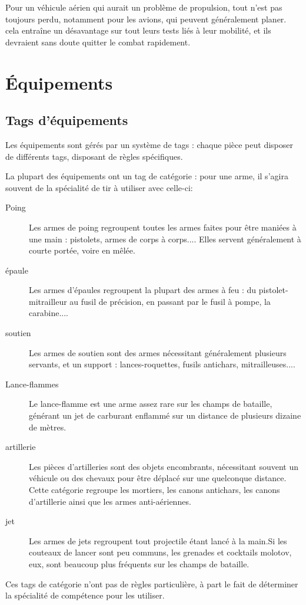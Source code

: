 \documentclass{report}
\begin{document}
\begin{multicols}{2}
Pour un véhicule aérien qui aurait un problème de propulsion, tout n'est pas toujours perdu, notamment pour les avions, qui peuvent généralement planer. cela entraîne un désavantage sur tout leurs tests liés à leur mobilité, et ils devraient sans doute quitter le combat rapidement.
\section{Équipements}
\subsection{Tags d'équipements}
Les équipements sont gérés par un système de tags : chaque pièce peut disposer de différents tags, disposant de règles spécifiques.

La plupart des équipements ont un tag de catégorie : pour une arme, il s'agira souvent de la spécialité de tir à utiliser avec celle-ci:
\begin{description}
\item[Poing] Les armes de poing regroupent toutes les armes faites pour être maniées à une main : pistolets, armes de corps à corps.... Elles servent généralement à courte portée, voire en mêlée.
\item[épaule] Les armes d'épaules regroupent la plupart des armes à feu : du pistolet-mitrailleur au fusil de précision, en passant par le fusil à pompe, la carabine....
\item[soutien]Les armes de soutien sont des armes nécessitant généralement plusieurs servants, et un support : lances-roquettes, fusils antichars, mitrailleuses....
\item[Lance-flammes]Le lance-flamme est une arme assez rare sur les champs de bataille, générant un jet de carburant enflammé sur un distance de plusieurs dizaine de mètres.
\item[artillerie]Les pièces d'artilleries sont des objets encombrants, nécessitant souvent un véhicule ou des chevaux pour être déplacé sur une quelconque distance. Cette catégorie regroupe les mortiers, les canons antichars, les canons d'artillerie ainsi que les armes anti-aériennes.
\item[jet] Les armes de jets regroupent tout projectile étant lancé à la main.Si les couteaux de lancer sont peu communs, les grenades et cocktails molotov, eux, sont beaucoup plus fréquents sur les champs de bataille.
\end{description}
Ces tags de catégorie n'ont pas de règles particulière, à part le fait de déterminer la spécialité de compétence pour les utiliser.


\end{multicols}
\end{document}
